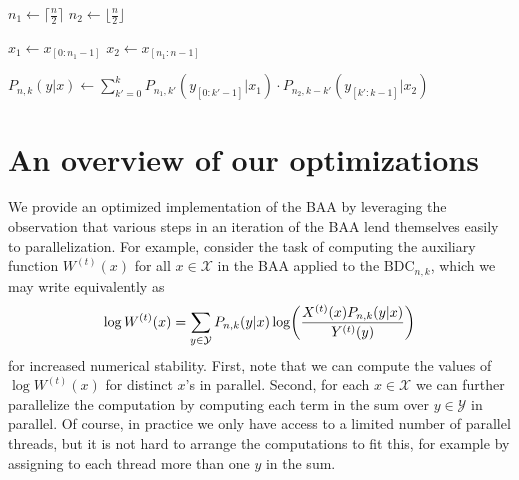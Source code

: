 \documentclass[11pt]{article}
\newcommand{\cX}{\mathcal{X}}
\newcommand{\cY}{\mathcal{Y}}
\newcommand{\BDC}{\mathrm{BDC}}
\let\originalleft\left
\let\originalright\right
\renewcommand{\left}{\mathopen{}\mathclose\bgroup\originalleft}
\renewcommand{\right}{\aftergroup\egroup\originalright}
\begin{document}
\begin{algorithm}
\caption{Cache-based computation of transition probabilities \cite[Algorithm 3 with adapted notation]{RC23}}
\label{alg:pxy}

    $n_1 \gets \lceil\frac{n}{2}\rceil$\;
    $n_2 \gets \lfloor\frac{n}{2}\rfloor$\;
    
    $x_1 \gets x_{[0:n_1-1]}$
    $x_2 \gets x_{[n_1:n-1]}$ \;
    
    $\displaystyle P_{n,k}(y|x) \gets \sum_{k'=0}^k P_{n_1,k'}(y_{[0:k'-1]}|x_1) \cdot P_{n_2,k-k'}(y_{[k':k-1]}|x_2)$\;

    \;
\end{algorithm}




\section{An overview of our optimizations}\label{sec:overview}

We provide an optimized implementation of the BAA by leveraging the observation that various steps in an iteration of the BAA lend themselves easily to parallelization.
For example, consider the task of computing the auxiliary function $W^{(t)}(x)$ for all $x\in\cX$ in the BAA applied to the $\BDC_{n,k}$, which we may write equivalently as
\begin{equation*}
    \log W^{(t)}(x)=\sum_{y\in\cY} P_{n,k}(y|x) \log\left(\frac{X^{(t)}(x) P_{n,k}(y|x)}{Y^{(t)}(y)}\right)
\end{equation*}
for increased numerical stability.
First, note that we can compute the values of $ \log W^{(t)}(x)$ for distinct $x$'s in parallel.
Second, for each $x\in\cX$ we can further parallelize the computation by computing each term in the sum over $y\in\cY$ in parallel.
Of course, in practice we only have access to a limited number of parallel threads, but it is not hard to arrange the computations to fit this, for example by assigning to each thread more than one $y$ in the sum.
\end{document}
